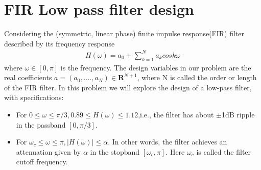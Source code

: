 \documentclass[conference]{IEEEtran}
\begin{document}
\section{FIR Low pass filter design}
Considering the (symmetric, linear phase) finite impulse response(FIR) filter described by its frequency response
\begin{align}
H(\omega) = a_0 + \sum_{k=1}^{N}a_kcosk\omega
\end{align}
where $\omega \in [0,\pi]$ is the frequency. The design variables in our problem are the real coefficients $a = (a_0,....,a_N)\in \textbf{R}^{N+1}$, where N is called the order or length of the FIR filter. In this problem we will explore the design of a low-pass filter, with specifications:
\begin{itemize}
\item For $0\le\omega\le\pi/3,0.89\le H(\omega)\le1.12$,i.e., the filter has about $\pm$1dB ripple in the passband $[0,\pi/3]$.
\item For $\omega_c\le\omega\le\pi, |H(\omega)|\le \alpha$. In other words, the filter achieves an attenuation given by $\alpha$ in the stopband $[\omega_c,\pi]$. Here $\omega_c$ is called the filter cutoff frequency.
\end{itemize} 
\end{document}
